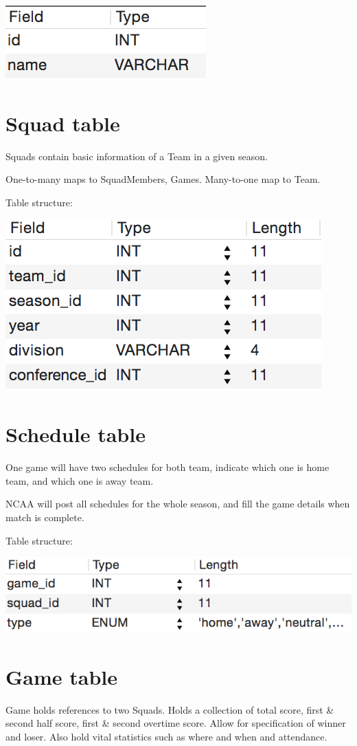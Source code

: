 \documentclass[letterpaper,10pt,english]{sphinxmanual}
\begin{document}
\includegraphics{team_table.png}


\section{Squad table}
\label{_static/database:squad-table}
Squads contain basic information of a Team in a given season.

One-to-many maps to SquadMembers, Games. Many-to-one map to Team.

Table structure:

\includegraphics{squad_table.png}


\section{Schedule table}
\label{_static/database:schedule-table}
One game will have two schedules for both team, indicate which one is
home team, and which one is away team.

NCAA will post all schedules for the whole season, and fill the game
details when match is complete.

Table structure:

\includegraphics{schedule_table.png}


\section{Game table}
\label{_static/database:game-table}
Game holds references to two Squads. Holds a collection of total score,
first \& second half score, first \& second overtime score.
Allow for specification of winner and loser.
Also hold vital statistics such as where and when and attendance.
\end{document}

